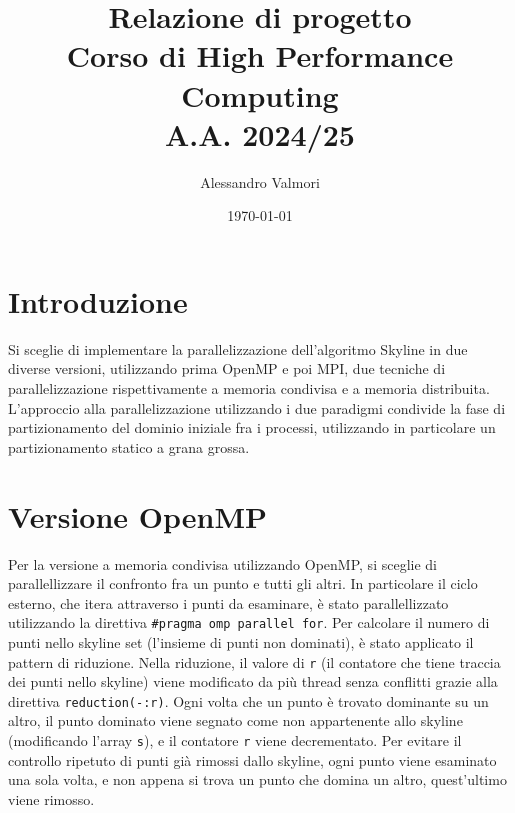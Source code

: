 \documentclass[letterpaper,11pt,leqno]{article}
\title{\vspace{-1cm} Relazione di progetto \\ Corso di High Performance Computing \\ A.A. 2024/25}
\author{Alessandro Valmori}
\date{\vspace{-0.3cm} \today}  %
\begin{document}
\begingroup\let\newpage\relax\maketitle\endgroup  %

\vspace{-1cm}  %





\section{Introduzione}\label{s:introduction}
 
Si sceglie di implementare la parallelizzazione dell'algoritmo Skyline in due diverse versioni, utilizzando prima OpenMP e poi MPI, due tecniche di parallelizzazione rispettivamente a memoria condivisa e a memoria distribuita. L'approccio alla parallelizzazione utilizzando i due paradigmi condivide la fase di partizionamento del dominio iniziale fra i processi, utilizzando in particolare un partizionamento statico a grana grossa. 



\section{Versione OpenMP}\label{s:section}


Per la versione a memoria condivisa utilizzando OpenMP, si sceglie di parallellizzare il confronto fra un punto e tutti gli altri. In particolare il ciclo esterno, che itera attraverso i punti da esaminare, è stato parallellizzato utilizzando la direttiva \texttt{\#pragma omp parallel for}. Per calcolare il numero di punti nello skyline set (l'insieme di punti non dominati), è stato applicato il pattern di riduzione. Nella riduzione, il valore di \texttt{r} (il contatore che tiene traccia dei punti nello skyline) viene modificato da più thread senza conflitti grazie alla direttiva \texttt{reduction(-:r)}. Ogni volta che un punto è trovato dominante su un altro, il punto dominato viene segnato come non appartenente allo skyline (modificando l'array \texttt{s}), e il contatore \texttt{r} viene decrementato. Per evitare il controllo ripetuto di punti già rimossi dallo skyline, ogni punto viene esaminato una sola volta, e non appena si trova un punto che domina un altro, quest'ultimo viene rimosso.
\end{document}
